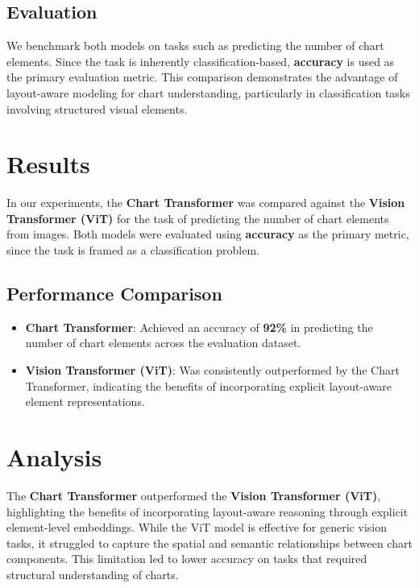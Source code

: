 \documentclass[11pt]{article}
\begin{document}
\subsection*{Evaluation}

We benchmark both models on tasks such as predicting the number of chart elements. Since the task is inherently classification-based, \textbf{accuracy} is used as the primary evaluation metric. This comparison demonstrates the advantage of layout-aware modeling for chart understanding, particularly in classification tasks involving structured visual elements.


\section{Results}

In our experiments, the \textbf{Chart Transformer} was compared against the \textbf{Vision Transformer (ViT)} for the task of predicting the number of chart elements from images. Both models were evaluated using \textbf{accuracy} as the primary metric, since the task is framed as a classification problem.

\subsection*{Performance Comparison}

\begin{itemize}
    \item \textbf{Chart Transformer}: Achieved an accuracy of \textbf{92\%} in predicting the number of chart elements across the evaluation dataset.
    \item \textbf{Vision Transformer (ViT)}: Was consistently outperformed by the Chart Transformer, indicating the benefits of incorporating explicit layout-aware element representations.
\end{itemize}


\section{Analysis} 

The \textbf{Chart Transformer} outperformed the \textbf{Vision Transformer (ViT)}, highlighting the benefits of incorporating layout-aware reasoning through explicit element-level embeddings. While the ViT model is effective for generic vision tasks, it struggled to capture the spatial and semantic relationships between chart components. This limitation led to lower accuracy on tasks that required structural understanding of charts.
\end{document}
